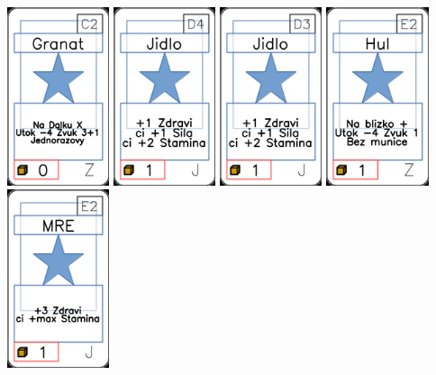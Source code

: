 \documentclass[a4paper]{article}
\begin{document}
	\includegraphics[width=3.0cm]{img-1_101}
	\includegraphics[width=3.0cm]{img-1_18}
	\includegraphics[width=3.0cm]{img-1_17}
	\includegraphics[width=3.0cm]{img-1_81}
	\includegraphics[width=3.0cm]{img-1_21}
\end{document}
